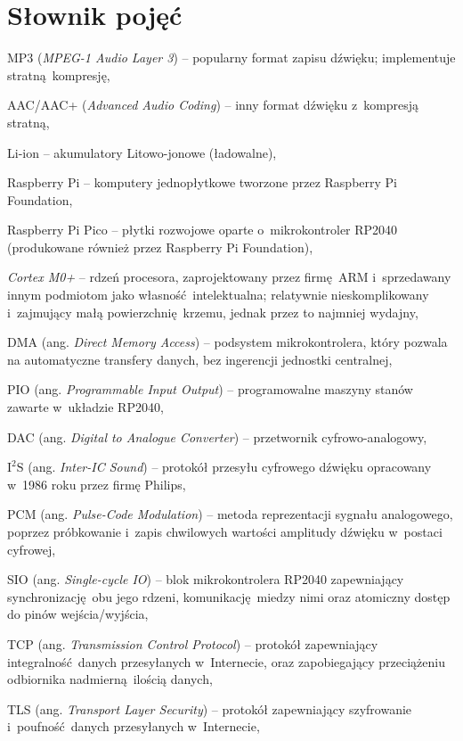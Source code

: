 \documentclass[polish]{aghengthesis}
\let\tempone\itemize
\let\temptwo\enditemize
\renewenvironment{itemize}{\tempone\setlength{\itemsep}{0cm}}{\temptwo}
\newcommand{\isqs}{$\text{I}^{2}\text{S}$}
\begin{document}
	\section{Słownik pojęć}
	\begin{itemize}
		\setlength{\itemsep}{0.3cm}
		\item MP3 (\textit{MPEG-1 Audio Layer 3}) -- popularny format zapisu dźwięku; implementuje stratną kompresję,
		\item AAC/AAC+ (\textit{Advanced Audio Coding}) -- inny format dźwięku z~kompresją stratną,
		\item Li-ion -- akumulatory Litowo-jonowe (ładowalne),
		\item Raspberry Pi -- komputery jednopłytkowe tworzone przez Raspberry Pi Foundation,
		\item Raspberry Pi Pico -- płytki rozwojowe oparte o~mikrokontroler RP2040 (produkowane również przez Raspberry Pi Foundation),
		\item \textit{Cortex M0+} -- rdzeń procesora, zaprojektowany przez firmę ARM i~sprzedawany innym podmiotom jako własność intelektualna; relatywnie nieskomplikowany i~zajmujący małą powierzchnię krzemu, jednak przez to najmniej wydajny,
		\item DMA (ang. \textit{Direct Memory Access}) -- podsystem mikrokontrolera, który pozwala na automatyczne transfery danych, bez ingerencji jednostki centralnej,
		\item PIO (ang. \textit{Programmable Input Output}) -- programowalne maszyny stanów zawarte w~układzie RP2040,
		\item DAC (ang. \textit{Digital to Analogue Converter}) -- przetwornik cyfrowo-analogowy,
		\item \isqs{} (ang. \textit{Inter-IC Sound}) -- protokół przesyłu cyfrowego dźwięku opracowany w~1986 roku przez firmę Philips,
		\item PCM (ang. \textit{Pulse-Code Modulation}) -- metoda reprezentacji sygnału analogowego, poprzez próbkowanie i~zapis chwilowych wartości amplitudy dźwięku w~postaci cyfrowej,
		\item SIO (ang. \textit{Single-cycle IO}) -- blok mikrokontrolera RP2040 zapewniający synchronizację obu jego rdzeni, komunikację miedzy nimi oraz atomiczny dostęp do pinów wejścia/wyjścia,
		\item TCP (ang. \textit{Transmission Control Protocol}) -- protokół zapewniający integralność danych przesyłanych w~Internecie, oraz zapobiegający przeciążeniu odbiornika nadmierną ilością danych,
		\item TLS (ang. \textit{Transport Layer Security}) -- protokół zapewniający szyfrowanie i~poufność danych przesyłanych w~Internecie,
	\end{itemize}
\end{document}
